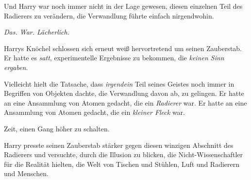 Und Harry war noch immer nicht in der Lage gewesen, diesen einzelnen Teil des Radierers zu verändern, die Verwandlung führte einfach nirgendwohin.

\emph{Das. War. Lächerlich.}

Harrys Knöchel schlossen sich erneut weiß hervortretend um seinen Zauberstab. Er hatte es \emph{satt}, experimentelle Ergebnisse zu bekommen, die \emph{keinen Sinn ergaben.}

Vielleicht hielt die Tatsache, dass \emph{irgendein} Teil seines Geistes noch immer in Begriffen von Objekten dachte, die Verwandlung davon ab, zu gelingen. Er hatte an eine Ansammlung von Atomen gedacht, die ein \emph{Radierer} war. Er hatte an eine Ansammlung von Atomen gedacht, die ein \emph{kleiner Fleck} war.

Zeit, einen Gang höher zu schalten.

Harry presste seinen Zauberstab stärker gegen diesen winzigen Abschnitt des Radierers und versuchte, durch die Illusion zu blicken, die Nicht-Wissenschaftler für die Realität hielten, die Welt von Tischen und Stühlen, Luft und Radierern und Menschen.

